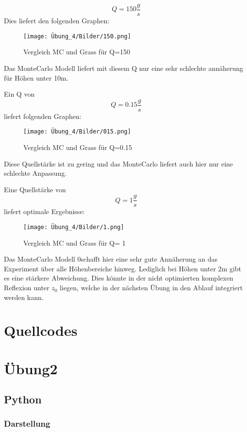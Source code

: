 \documentclass[ngerman]{scrartcl}
\begin{document}
\begin{equation}
Q= 150 \frac{g}{s}
\end{equation}
Dies liefert den folgenden Graphen: 
\begin{figure}[H]
    \centering
    \texttt{[image: Übung\_4/Bilder/150.png]}
    \caption{Vergleich MC und Grass für Q=150}
    \label{fig:my_label}
\end{figure}

Das  MonteCarlo Modell liefert mit diesem Q nur eine sehr schlechte annäherung für Höhen unter 10m.

Ein Q von
\begin{equation}
Q= 0.15 \frac{g}{s}
\end{equation}
 liefert folgenden Graphen:
\begin{figure}[H]
    \centering
    \texttt{[image: Übung\_4/Bilder/015.png]}
    \caption{Vergleich MC und Grass für Q=0.15}
    \label{fig:my_label}
\end{figure}
Diese Quellstärke ist zu gering und das MonteCarlo liefert auch hier nur eine schlechte Anpassung.

Eine Quellstärke von 
\begin{equation}
Q= 1 \frac{g}{s}
\end{equation}
liefert optimale Ergebnisse:
\begin{figure}[H]
    \centering
    \texttt{[image: Übung\_4/Bilder/1.png]}
    \caption{Vergleich MC und Grass für Q= 1}
    \label{fig:my_label}
\end{figure}

Das MonteCarlo Modell 0schafft hier eine sehr gute Annäherung an das Experiment über alle Höhenbereiche hinweg. Lediglich bei Höhen unter 2m gibt es eine stärkere Abweichung. Dies könnte in der nicht optimierten komplexen Reflexion unter $z_{0}$ liegen, welche in der nächsten Übung in den Ablauf integriert werden kann.


\section{Quellcodes}
\section{Übung2}
\subsection{Python}
\subsubsection{Darstellung}
%
\end{document}
